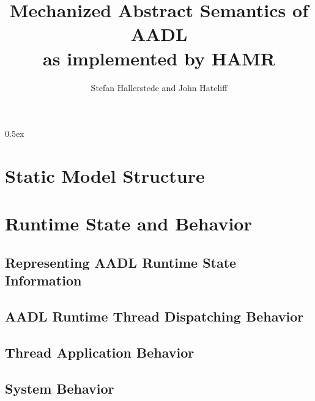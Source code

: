 \documentclass[10pt,oneside]{book}
\begin{document}
\title{Mechanized Abstract Semantics of AADL \\  as implemented by HAMR}
\author{Stefan Hallerstede and John Hatcliff}
\maketitle

\tableofcontents

\parindent 0pt\parskip 0.5ex

%

\newpage

% 

\part{Static Model Structure}



\part{Runtime State and Behavior}

\chapter{Representing AADL Runtime State Information}







\chapter{AADL Runtime Thread Dispatching Behavior}



\chapter{Thread Application Behavior}



\chapter{System Behavior}
\end{document}
